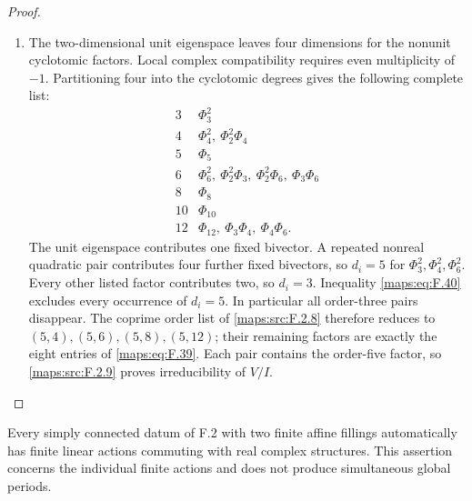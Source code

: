 \begin{proof}
\begin{enumerate}[label=\arabic*.]
\item The two-dimensional unit eigenspace leaves four dimensions
for the nonunit cyclotomic factors.  Local complex compatibility
requires even multiplicity of $-1$.  Partitioning four into the
cyclotomic degrees gives the following complete list:
\[
\begin{array}{c|l}
3&\Phi_3^2\\
4&\Phi_4^2,\ \Phi_2^2\Phi_4\\
5&\Phi_5\\
6&\Phi_6^2,\ \Phi_2^2\Phi_3,\ \Phi_2^2\Phi_6,\ \Phi_3\Phi_6\\
8&\Phi_8\\
10&\Phi_{10}\\
12&\Phi_{12},\ \Phi_3\Phi_4,\ \Phi_4\Phi_6.
\end{array}
\]
The unit eigenspace contributes one fixed bivector.  A repeated
nonreal quadratic pair contributes four further fixed bivectors,
so $d_i=5$ for $\Phi_3^2,\Phi_4^2,\Phi_6^2$.
Every other listed factor contributes two, so $d_i=3$.
Inequality \eqref{maps:eq:F.40} excludes every occurrence of
$d_i=5$.  In particular all order-three pairs disappear.
The coprime order list of \cref{maps:src:F.2.8} therefore reduces
to $(5,4),(5,6),(5,8),(5,12)$; their remaining factors are exactly
the eight entries of \eqref{maps:eq:F.39}.
Each pair contains the order-five factor, so
\cref{maps:src:F.2.9} proves irreducibility of $V/I$.
\end{enumerate}
\end{proof}




\begin{proposition}\label{maps:src:F.2.15}


Every simply connected datum of F.2 with two finite affine
fillings automatically has finite linear actions commuting
with real complex structures.  This assertion concerns the
individual finite actions and does not produce simultaneous
global periods.

\end{proposition}


